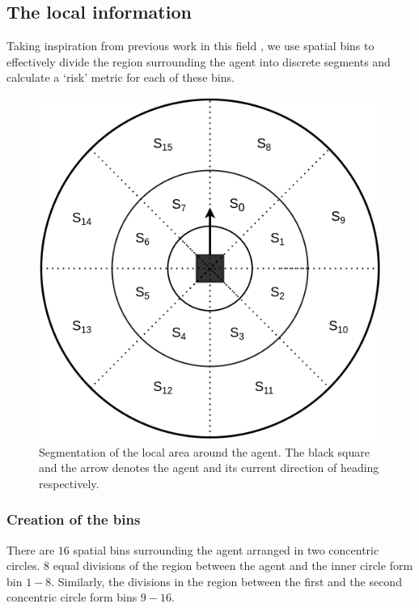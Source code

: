 \subsection*{The local information}
Taking inspiration from previous work in this field \cite{fahad_learning_2018} \cite{vasquez_inverse_2014}, we use spatial bins to effectively divide the region surrounding the agent into discrete segments and calculate a `risk' metric for each of these bins.
    \begin{figure}[htbp]
	\centering
	\includegraphics[width=0.5\linewidth]{figures/risk_features_spatial_bins.png}
	\caption{Segmentation of the local area around the agent. The black square and the arrow denotes the agent and its current direction of heading respectively.}
	\label{fig:risk_local_bins}
\end{figure}
\subsubsection*{Creation of the bins}
There are $16$ spatial bins surrounding the agent arranged in two concentric circles. $8$ equal divisions of the region between the agent and the inner circle form bin $1-8$. Similarly, the divisions in the region between the first and the second concentric circle form bins $9 - 16$.
